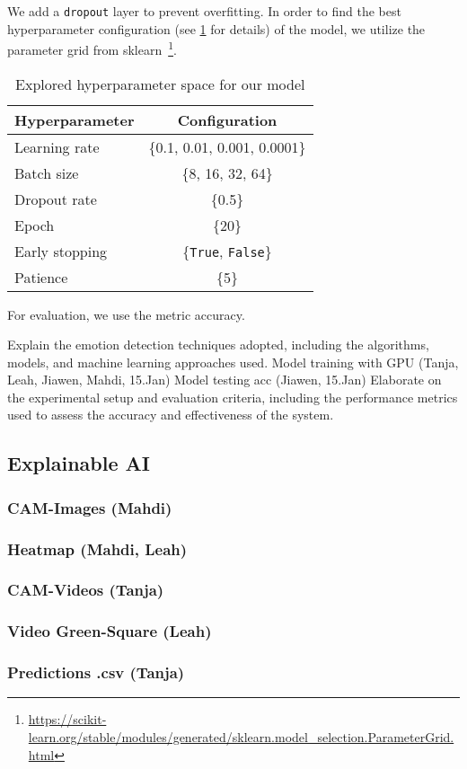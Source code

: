 We add a \texttt{dropout} layer to prevent overfitting. 
In order to find the best hyperparameter configuration (see \cref{tab:hyper} for details) of the model, 
we utilize the parameter grid from sklearn~\footnote{\url{https://scikit-learn.org/stable/modules/generated/sklearn.model_selection.ParameterGrid.html}}. 

\begin{table}[ht]
    \centering
    \begin{tabular}{@{}lc@{}}
      \toprule
      Hyperparameter & Configuration \\
      \midrule
      Learning rate & \{0.1, 0.01, 0.001, 0.0001\}  \\
      Batch size & \{8, 16, 32, 64\} \\
      Dropout rate & \{0.5\} \\
      Epoch & \{20\} \\
      Early stopping & \{\texttt{True}, \texttt{False}\} \\
      Patience & \{5\} \\
      \bottomrule
    \end{tabular}
    \caption{Explored hyperparameter space for our model}
    \label{tab:hyper}
  \end{table}

For evaluation, we use the metric accuracy.

Explain the emotion detection techniques adopted, including the algorithms, models, and machine learning approaches used.
Model training with GPU (Tanja, Leah, Jiawen, Mahdi, 15.Jan)
Model testing acc (Jiawen, 15.Jan)
Elaborate on the experimental setup and evaluation criteria, including the performance metrics used to assess the accuracy and effectiveness of the system.

\subsection{Explainable AI}
\subsubsection{CAM-Images (Mahdi)}
\subsubsection{Heatmap (Mahdi, Leah)}
\subsubsection{CAM-Videos (Tanja)}
\subsubsection{Video Green-Square (Leah)}
\subsubsection{Predictions .csv (Tanja)}